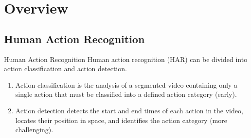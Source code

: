 
\section{Overview}
\subsection{Human Action Recognition}
\begin{frame}{Human Action Recognition}
    Human action recognition (HAR) can be divided into action classification and action detection.

    \begin{enumerate}
        \item<1-> Action classification is the analysis of a segmented video containing only a single action that must be classified into a defined action category (early).
        \item<2-> Action detection detects the start and end times of each action in the video, locates their position in space, and identifies the action category (more challenging).
    \end{enumerate}


\end{frame}


